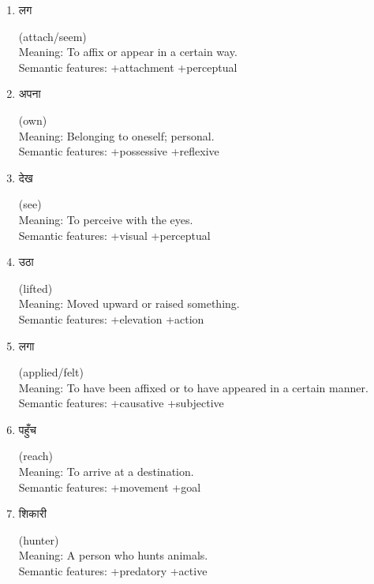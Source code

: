 \documentclass{article}
\begin{document}
\begin{enumerate}
\item \begin{hindi} लग \end{hindi} (attach/seem) \\
Meaning: To affix or appear in a certain way. \\
Semantic features: +attachment +perceptual

\item \begin{hindi} अपना \end{hindi} (own) \\
Meaning: Belonging to oneself; personal. \\
Semantic features: +possessive +reflexive

\item \begin{hindi} देख \end{hindi} (see) \\
Meaning: To perceive with the eyes. \\
Semantic features: +visual +perceptual

\item \begin{hindi} उठा \end{hindi} (lifted) \\
Meaning: Moved upward or raised something. \\
Semantic features: +elevation +action

\item \begin{hindi} लगा \end{hindi} (applied/felt) \\
Meaning: To have been affixed or to have appeared in a certain manner. \\
Semantic features: +causative +subjective

\item \begin{hindi} पहुँच \end{hindi} (reach) \\
Meaning: To arrive at a destination. \\
Semantic features: +movement +goal

\item \begin{hindi} शिकारी \end{hindi} (hunter) \\
Meaning: A person who hunts animals. \\
Semantic features: +predatory +active


\end{enumerate}
\end{document}
